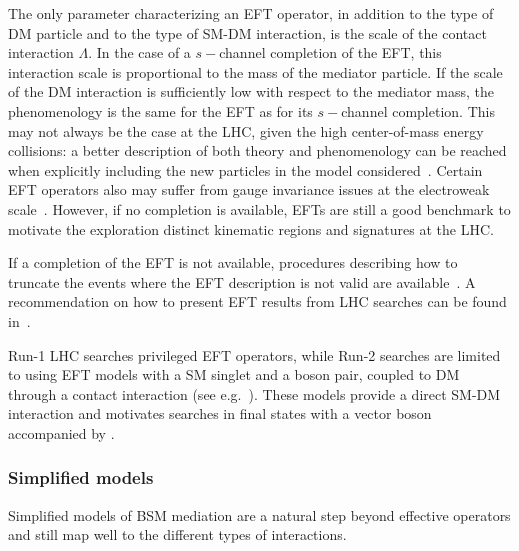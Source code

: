 The only parameter characterizing an EFT operator, in addition to the type of DM particle and to the type of SM-DM interaction, is the scale of the contact interaction $\Lambda$. In the case of a $s-$channel completion of the EFT, this interaction scale is proportional to the mass of the mediator particle. If the scale of the DM interaction is sufficiently low with respect to the mediator mass, the phenomenology is the same for the EFT as for its $s-$channel completion. 
This may not always be the case at the LHC, given the high center-of-mass energy collisions: a better description of both theory and phenomenology can be reached when explicitly including the new particles in the model considered~\cite{Buchmueller:2013dya,DeSimone:2016fbz,Berlin:2014cfa}. Certain EFT operators also may suffer from gauge invariance issues at the electroweak scale~\cite{Bell:2015sza}. However, if no completion is available, EFTs are still a good benchmark to motivate the exploration distinct kinematic regions and signatures at the LHC. %

\begin{marginnote}[]
If a completion of the EFT is not available, procedures describing how to truncate the events where the EFT description is not valid are available~\cite{Racco:2015dxa,Busoni:2014sya,Busoni:2013lha,Busoni:2014haa}. A recommendation on how to present EFT results from LHC searches can be found in~\cite{Abercrombie:2015wmb}.
\end{marginnote}

Run-1 LHC searches privileged EFT operators, while Run-2 searches are limited to using EFT models with a SM singlet and a boson pair, coupled to DM through a contact interaction (see e.g.~\cite{Petrov:2013nia,Berlin:2014cfa}). These models provide a direct SM-DM interaction and motivates searches in final states with a vector boson accompanied by \MET. 

\subsubsection{Simplified models}
\label{sub:simplifiedModels}
 
Simplified models of BSM mediation are a natural step beyond effective operators and still map well to the different types of interactions. 

